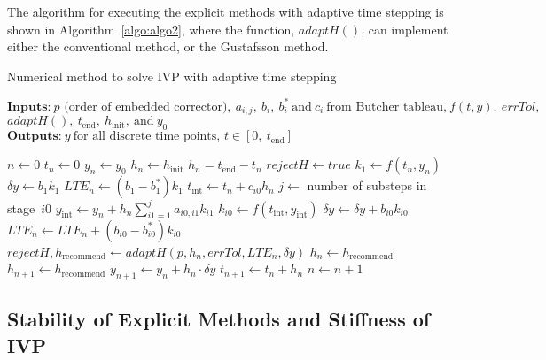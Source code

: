 The algorithm for executing the explicit methods with adaptive time stepping is shown in Algorithm~\ref{algo:algo2}, where the function, $adaptH()$, can implement either the conventional method, or the Gustafsson method. \begin{algorithm}[H]
\caption{Numerical method to solve IVP with adaptive time stepping}
\label{algo:algo2}
\hspace*{\algorithmicindent} $\textbf{Inputs:}~p\text{~(order of embedded corrector)},~a_{i,j},~b_{i},~b^{*}_{i}~\text{and}~c_{i}~\text{from Butcher tableau,}~f(t,y),~errTol,$ \\
\hspace*{\algorithmicindent}\hspace*{\algorithmicindent}$adaptH(),~t_\text{end},~h_\text{init},~\text{and}~y_{0}$ \\
\hspace*{\algorithmicindent} $\textbf{Outputs:}~y~\text{for all discrete time points,~}t\in{}[0,~t_\text{end}] $
\begin{algorithmic}[1]
\State $n \gets 0$
\State $t_{n} \gets 0$
\State $y_{n} \gets y_{0}$
\State $h_{n} \gets h_\text{init}$
    \State $h_{n} = t_\text{end} - t_{n}$
  \EndIf
  \State $rejectH \gets true$
    \State $k_{1} \gets f(t_{n}, y_{n})$
    \State $\delta{}y \gets b_{1}k_{1}$
    \State $LTE_{n} \gets (b_{1} - b^{*}_{1})k_{1}$
      \State $t_\text{int} \gets t_{n} + c_{i0}h_{n}$
      \State $j \gets$ number of substeps in stage~$i0$
      \State $y_\text{int} \gets y_{n} + h_{n}\sum^{j}_{i1=1}a_{i0,i1}k_{i1}$
      \State $k_{i0} \gets f(t_\text{int},y_\text{int})$
      \State $\delta{}y \gets \delta{}y + b_{i0}k_{i0}$
      \State $LTE_{n} \gets LTE_{n} + (b_{i0} - b^{*}_{i0})k_{i0}$
    \EndFor
    \State $rejectH, h_\text{recommend} \gets adaptH(p, h_{n}, errTol, LTE_{n}, \delta{}y)$
      \State $h_{n} \gets h_\text{recommend}$
    \Else
      \State $h_{n+1} \gets h_\text{recommend}$
    \EndIf
  \EndWhile
  \State $y_{n+1} \gets y_{n} + h_{n}\cdot\delta{}y$
  \State $t_{n+1} \gets t_{n} + h_{n}$
  \State $n \gets n+1$
\EndWhile
\end{algorithmic}
\end{algorithm}

\subsection{Stability of Explicit Methods and Stiffness of IVP}\label{subsec:stabilityExp}

